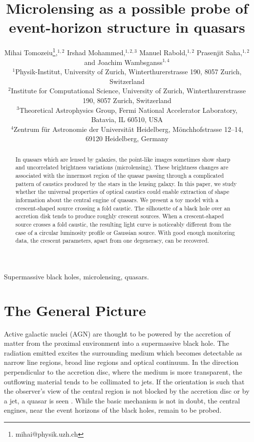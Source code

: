 \documentclass[usenatbib]{mn2e}
\title{Microlensing as a possible probe of event-horizon structure in quasars}
\author[Tomozeiu et al]{Mihai Tomozeiu\thanks{mihai@physik.uzh.ch},$^{1,2}$ 
Irshad Mohammed,$^{1,2,3}$ 
Manuel Rabold,$^{1,2}$
Prasenjit Saha,$^{1,2}$  
\newauthor
and Joachim Wambsganss$^{1,4}$\\
$^1${Physik-Institut, University of Zurich, Winterthurerstrasse 190,
  8057 Zurich, Switzerland} \\
$^2${Institute for Computational Science, University of Zurich,
  Winterthurerstrasse 190, 8057 Zurich, Switzerland} \\
$^3${Theoretical Astrophysics Group, Fermi National Accelerator Laboratory, Batavia, IL 60510, USA}\\
$^4${Zentrum f\"ur Astronomie der Universit\"at Heidelberg,
  M\"onchhofstrasse 12--14, 69120 Heidelberg, Germany}
}
\begin{document}
\maketitle

\begin{abstract}

In quasars which are lensed by galaxies, the point-like images sometimes show sharp and uncorrelated brightness 
variations (microlensing). These brightness changes are associated with the innermost region of the quasar passing 
through a complicated pattern of caustics produced by the stars in the lensing galaxy. In this paper, we study 
whether the universal properties of optical caustics could enable extraction of shape information about the central 
engine of quasars. We present a toy model with a crescent-shaped source crossing a fold caustic. The silhouette 
of a black hole over an accretion disk tends to produce roughly crescent sources. When a crescent-shaped source 
crosses a fold caustic, the resulting light curve is noticeably different from the case of a circular luminosity 
profile or Gaussian source. With good enough monitoring data, the crescent parameters, apart from one degeneracy, 
can be recovered.

\end{abstract}


\begin{keywords}
Supermassive black holes, microlensing, quasars.
\end{keywords}

\section{The General Picture }

Active galactic nuclei (AGN) are thought to be powered by the accretion of
matter from the proximal environment into a supermassive black hole.
The radiation emitted excites the surrounding medium which becomes
detectable as narrow line regions, broad line regions and optical
continuum.  In the direction perpendicular to the accretion disc,
where the medium is more transparent, the outflowing material tends to be
collimated to jets.  If the orientation is such that the observer's
view of the central region is not blocked by the accretion disc or by
a jet, a quasar is seen \citep[e.g.,][]{1984RvMP...56..255B}.  While
the basic mechanism \citep[originating in the work
  of][]{1964ApJ...140..796S,1964SPhD....9..246Z,1969Natur.223..690L}
is not in doubt, the central engines, near the event horizons of the
black holes, remain to be probed.
\end{document}
